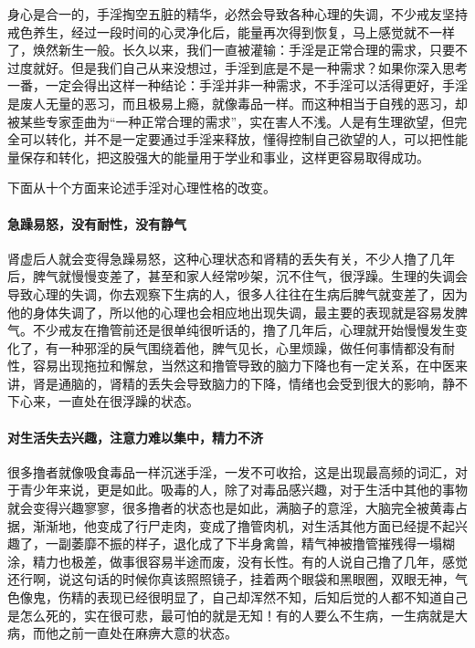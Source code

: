 身心是合一的，手淫掏空五脏的精华，必然会导致各种心理的失调，不少戒友坚持戒色养生，经过一段时间的心灵净化后，能量再次得到恢复，马上感觉就不一样了，焕然新生一般。长久以来，我们一直被灌输：手淫是正常合理的需求，只要不过度就好。但是我们自己从来没想过，手淫到底是不是一种需求？如果你深入思考一番，一定会得出这样一种结论：手淫并非一种需求，不手淫可以活得更好，手淫是废人无量的恶习，而且极易上瘾，就像毒品一样。而这种相当于自残的恶习，却被某些专家歪曲为“一种正常合理的需求”，实在害人不浅。人是有生理欲望，但完全可以转化，并不是一定要通过手淫来释放，懂得控制自己欲望的人，可以把性能量保存和转化，把这股强大的能量用于学业和事业，这样更容易取得成功。

下面从十个方面来论述手淫对心理性格的改变。

\paragraph{急躁易怒，没有耐性，没有静气}

肾虚后人就会变得急躁易怒，这种心理状态和肾精的丢失有关，不少人撸了几年后，脾气就慢慢变差了，甚至和家人经常吵架，沉不住气，很浮躁。生理的失调会导致心理的失调，你去观察下生病的人，很多人往往在生病后脾气就变差了，因为他的身体失调了，所以他的心理也会相应地出现失调，最主要的表现就是容易发脾气。不少戒友在撸管前还是很单纯很听话的，撸了几年后，心理就开始慢慢发生变化了，有一种邪淫的戾气围绕着他，脾气见长，心里烦躁，做任何事情都没有耐性，容易出现拖拉和懈怠，当然这和撸管导致的脑力下降也有一定关系，在中医来讲，肾是通脑的，肾精的丢失会导致脑力的下降，情绪也会受到很大的影响，静不下心来，一直处在很浮躁的状态。

\paragraph{对生活失去兴趣，注意力难以集中，精力不济}

很多撸者就像吸食毒品一样沉迷手淫，一发不可收拾，这是出现最高频的词汇，对于青少年来说，更是如此。吸毒的人，除了对毒品感兴趣，对于生活中其他的事物就会变得兴趣寥寥，很多撸者的状态也是如此，满脑子的意淫，大脑完全被黄毒占据，渐渐地，他变成了行尸走肉，变成了撸管肉机，对生活其他方面已经提不起兴趣了，一副萎靡不振的样子，退化成了下半身禽兽，精气神被撸管摧残得一塌糊涂，精力也极差，做事很容易半途而废，没有长性。有的人说自己撸了几年，感觉还行啊，说这句话的时候你真该照照镜子，挂着两个眼袋和黑眼圈，双眼无神，气色像鬼，伤精的表现已经很明显了，自己却浑然不知，后知后觉的人都不知道自己是怎么死的，实在很可悲，最可怕的就是无知！有的人要么不生病，一生病就是大病，而他之前一直处在麻痹大意的状态。

